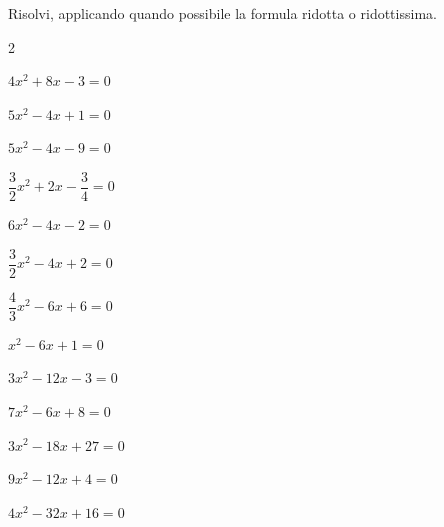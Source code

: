 \begin{esercizio}[*]
\label{ese:3.21}
Risolvi, applicando quando possibile la formula ridotta o ridottissima.
\begin{htmulticols}{2}
\begin{enumeratea}
\item \(4x^{2} +8x -3 = 0\)
\item \(5 x^{2}-4 x + 1 = 0\)
\sol{\emptyset}
\item \(5 x^{2}-4 x-9 = 0\)
\item \(\dfrac{3}{2} x^{2} + 2 x-\dfrac{3}{4} = 0\)
\item \(6 x^{2}-4 x-2 = 0\)
\item \(\dfrac{3}{2} x^{2}-4 x + 2 = 0\)
\item \(\dfrac{4}{3} x^{2}-6 x + 6 = 0\)
\item \(x^{2}-6 x + 1 = 0\)
\item \(3 x^{2}-12 x-3 = 0\)
\item \(7 x^{2}-6 x + 8 = 0\)
\sol{\emptyset}
\item \(3 x^{2}-18 x + 27 = 0\)
\item \(9 x^{2}-12 x + 4 = 0\)
\item \(4 x^{2}-32 x + 16 = 0\)
\end{enumeratea}
\end{htmulticols}
\end{esercizio}



